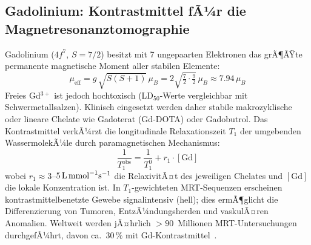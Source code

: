 ﻿\documentclass[12pt, a4paper]{report}
\theoremstyle{definition}
\theoremstyle{remark}
\begin{document}
\subsection{Gadolinium: Kontrastmittel fÃ¼r die Magnetresonanztomographie}

Gadolinium ($4f^7$, $S = 7/2$) besitzt mit 7 ungepaarten Elektronen das
grÃ¶ÃŸte permanente magnetische Moment aller stabilen Elemente:
\begin{equation}
  \mu_{\text{eff}} = g\,\sqrt{S(S+1)}\,\mu_B = 2\sqrt{\tfrac{7}{2}\cdot\tfrac{9}{2}}\,\mu_B
  \approx 7.94\,\mu_B
  \label{eq:gd_moment}
\end{equation}
Freies Gd$^{3+}$ ist jedoch hochtoxisch (LD$_{50}$-Werte vergleichbar mit
Schwermetallsalzen). Klinisch eingesetzt werden daher stabile makrozyklische
oder lineare Chelate wie Gadoterat (Gd-DOTA) oder Gadobutrol. Das
Kontrastmittel verkÃ¼rzt die longitudinale Relaxationszeit $T_1$ der
umgebenden WassermolekÃ¼le durch paramagnetischen Mechanismus:
\begin{equation}
  \frac{1}{T_1^{\text{obs}}} = \frac{1}{T_1^0} + r_1 \cdot [\text{Gd}]
  \label{eq:solomon}
\end{equation}
wobei $r_1 \approx 3$--$5\,\text{L\,mmol}^{-1}\text{s}^{-1}$ die RelaxivitÃ¤t
des jeweiligen Chelates und $[\text{Gd}]$ die lokale Konzentration ist.
In $T_1$-gewichteten MRT-Sequenzen erscheinen kontrastmittelbenetzte Gewebe
signalintensiv (hell); dies ermÃ¶glicht die Differenzierung von Tumoren,
EntzÃ¼ndungsherden und vaskulÃ¤ren Anomalien. Weltweit werden jÃ¤hrlich
$>90$~Millionen MRT-Untersuchungen durchgefÃ¼hrt, davon ca.~$30\,\%$ mit
Gd-Kontrastmittel~\cite{balaram2019}.
\end{document}
